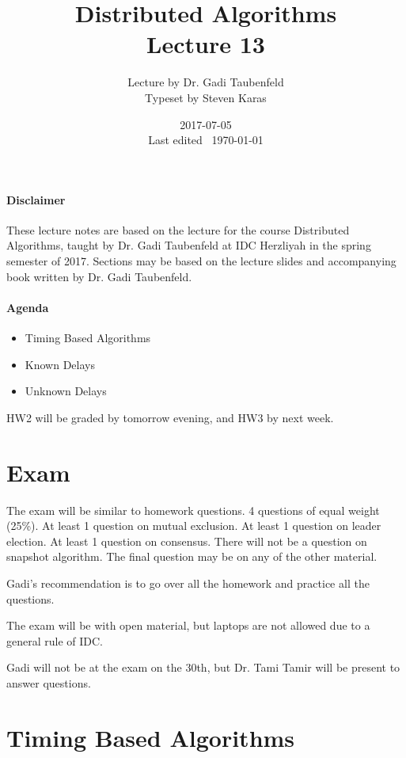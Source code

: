 \documentclass{idc_msc}
\title{Distributed Algorithms\\\large Lecture 13}
\date{2017-07-05 \\ Last edited \currenttime\ \today}
\author{Lecture by Dr. Gadi Taubenfeld\\Typeset by Steven Karas}
\begin{document}
\maketitle

\paragraph{Disclaimer}

These lecture notes are based on the lecture for the course Distributed Algorithms, taught by Dr. Gadi Taubenfeld at IDC Herzliyah in the spring semester of 2017.
Sections may be based on the lecture slides and accompanying book written by Dr. Gadi Taubenfeld.

\paragraph{Agenda}

\begin{itemize}
  \item Timing Based Algorithms
  \item Known Delays
  \item Unknown Delays
\end{itemize}

HW2 will be graded by tomorrow evening, and HW3 by next week.

\section{Exam}

The exam will be similar to homework questions.
4 questions of equal weight (25\%).
At least 1 question on mutual exclusion.
At least 1 question on leader election.
At least 1 question on consensus.
There will not be a question on snapshot algorithm.
The final question may be on any of the other material.

Gadi's recommendation is to go over all the homework and practice all the questions.

The exam will be with open material, but laptops are not allowed due to a general rule of IDC.

Gadi will not be at the exam on the 30th, but Dr. Tami Tamir will be present to answer questions.

\section{Timing Based Algorithms}
\end{document}
